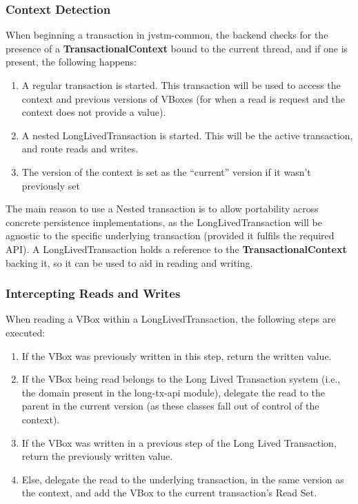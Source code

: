 \subsubsection{Context Detection}

When beginning a transaction in jvstm-common, the backend checks for
the presence of a {\bf TransactionalContext} bound to the current
thread, and if one is present, the following happens:

\begin{enumerate}

\item A regular transaction is started. This transaction will be used
  to access the context and previous versions of VBoxes (for when a
  read is request and the context does not provide a value).

\item A nested LongLivedTransaction is started. This will be the
  active transaction, and route reads and writes.

\item The version of the context is set as the ``current'' version if
  it wasn't previously set

\end{enumerate}

The main reason to use a Nested transaction is to allow portability
across concrete persistence implementations, as the
LongLivedTransaction will be agnostic to the specific underlying
transaction (provided it fulfils the required API). A
LongLivedTransaction holds a reference to the {\bf
  TransactionalContext} backing it, so it can be used to aid in
reading and writing.

\subsubsection{Intercepting Reads and Writes}

When reading a VBox within a LongLivedTransaction, the following
steps are executed:

\begin{enumerate}

\item If the VBox was previously written in this step, return the
  written value.

\item If the VBox being read belongs to the Long Lived Transaction
  system (i.e., the domain present in the long-tx-api module),
  delegate the read to the parent in the current version (as these
  classes fall out of control of the context).

\item If the VBox was written in a previous step of the Long Lived
  Transaction, return the previously written value.

\item Else, delegate the read to the underlying transaction, in the
  same version as the context, and add the VBox to the current
  transaction's Read Set.

\end{enumerate}


